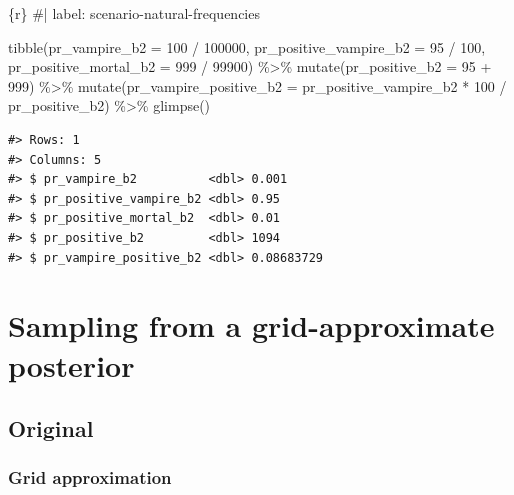 \documentclass[
  letterpaper,
  DIV=11,
  numbers=noendperiod]{scrreprt}
\newenvironment{Shaded}{\begin{snugshade}}{\end{snugshade}}
\newcommand{\AttributeTok}[1]{\textcolor[rgb]{0.40,0.45,0.13}{#1}}
\newcommand{\CommentTok}[1]{\textcolor[rgb]{0.37,0.37,0.37}{#1}}
\newcommand{\DecValTok}[1]{\textcolor[rgb]{0.68,0.00,0.00}{#1}}
\newcommand{\FunctionTok}[1]{\textcolor[rgb]{0.28,0.35,0.67}{#1}}
\newcommand{\InformationTok}[1]{\textcolor[rgb]{0.37,0.37,0.37}{#1}}
\newcommand{\NormalTok}[1]{\textcolor[rgb]{0.00,0.23,0.31}{#1}}
\newcommand{\SpecialCharTok}[1]{\textcolor[rgb]{0.37,0.37,0.37}{#1}}
\begin{document}
\begin{Shaded}
\begin{Highlighting}[]
\InformationTok{\textasciigrave{}\textasciigrave{}\textasciigrave{}\{r\}}
\CommentTok{\#| label: scenario{-}natural{-}frequencies}

\FunctionTok{tibble}\NormalTok{(}\AttributeTok{pr\_vampire\_b2          =} \DecValTok{100} \SpecialCharTok{/} \DecValTok{100000}\NormalTok{,}
       \AttributeTok{pr\_positive\_vampire\_b2 =} \DecValTok{95} \SpecialCharTok{/} \DecValTok{100}\NormalTok{,}
       \AttributeTok{pr\_positive\_mortal\_b2  =} \DecValTok{999} \SpecialCharTok{/} \DecValTok{99900}\NormalTok{) }\SpecialCharTok{\%\textgreater{}\%} 
  \FunctionTok{mutate}\NormalTok{(}\AttributeTok{pr\_positive\_b2 =} \DecValTok{95} \SpecialCharTok{+} \DecValTok{999}\NormalTok{) }\SpecialCharTok{\%\textgreater{}\%} 
  \FunctionTok{mutate}\NormalTok{(}\AttributeTok{pr\_vampire\_positive\_b2 =}\NormalTok{ pr\_positive\_vampire\_b2 }\SpecialCharTok{*} \DecValTok{100} \SpecialCharTok{/}\NormalTok{ pr\_positive\_b2) }\SpecialCharTok{\%\textgreater{}\%} 
  \FunctionTok{glimpse}\NormalTok{()}
\InformationTok{\textasciigrave{}\textasciigrave{}\textasciigrave{}}
\end{Highlighting}
\end{Shaded}

\begin{verbatim}
#> Rows: 1
#> Columns: 5
#> $ pr_vampire_b2          <dbl> 0.001
#> $ pr_positive_vampire_b2 <dbl> 0.95
#> $ pr_positive_mortal_b2  <dbl> 0.01
#> $ pr_positive_b2         <dbl> 1094
#> $ pr_vampire_positive_b2 <dbl> 0.08683729
\end{verbatim}

\hypertarget{sampling-from-a-grid-approximate-posterior}{%
\section{Sampling from a grid-approximate
posterior}\label{sampling-from-a-grid-approximate-posterior}}

\hypertarget{original-10}{%
\subsection{Original}\label{original-10}}

\hypertarget{grid-approximation-1}{%
\subsubsection{Grid approximation}\label{grid-approximation-1}}
\end{document}
